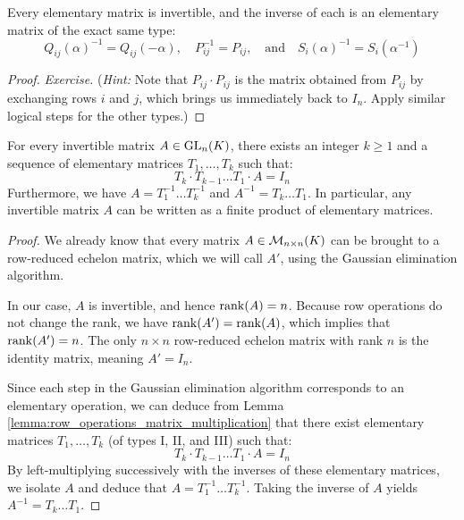 \begin{lemma}
\label{lemma:elementary_matrix_inverses}
Every elementary matrix is invertible, and the inverse of each is an elementary matrix of the exact same type:
\begin{equation*}
    Q_{ij}(\alpha)^{-1} = Q_{ij}(-\alpha), \quad P_{ij}^{-1} = P_{ij}, \quad \text{and} \quad S_i(\alpha)^{-1} = S_i(\alpha^{-1})
\end{equation*}
\end{lemma}

\begin{proof}
\textit{Exercise.} (\textit{Hint:} Note that $P_{ij} \cdot P_{ij}$ is the matrix obtained from $P_{ij}$ by exchanging rows $i$ and $j$, which brings us immediately back to $I_n$. Apply similar logical steps for the other types.)
\end{proof}

\begin{theorem}
\label{thm:elementary_matrix_decomposition}
For every invertible matrix $A \in \operatorname{GL}_n(K)$, there exists an integer $k \ge 1$ and a sequence of elementary matrices $T_1, \dots, T_k$ such that:
\begin{equation*}
    T_k \cdot T_{k-1} \dots T_1 \cdot A = I_n
\end{equation*}
Furthermore, we have $A = T_1^{-1} \dots T_k^{-1}$ and $A^{-1} = T_k \dots T_1$. In particular, any invertible matrix $A$ can be written as a finite product of elementary matrices.
\end{theorem}

\begin{proof}
We already know that every matrix $A \in \mathcal{M}_{n \times n}(K)$ can be brought to a row-reduced echelon matrix, which we will call $A'$, using the Gaussian elimination algorithm. 

In our case, $A$ is invertible, and hence $\operatorname{rank}(A) = n$. Because row operations do not change the rank, we have $\operatorname{rank}(A') = \operatorname{rank}(A)$, which implies that $\operatorname{rank}(A') = n$. The only $n \times n$ row-reduced echelon matrix with rank $n$ is the identity matrix, meaning $A' = I_n$. 

Since each step in the Gaussian elimination algorithm corresponds to an elementary operation, we can deduce from Lemma \ref{lemma:row_operations_matrix_multiplication} that there exist elementary matrices $T_1, \dots, T_k$ (of types I, II, and III) such that:
\begin{equation*}
    T_k \cdot T_{k-1} \dots T_1 \cdot A = I_n
\end{equation*}
By left-multiplying successively with the inverses of these elementary matrices, we isolate $A$ and deduce that $A = T_1^{-1} \dots T_k^{-1}$. Taking the inverse of $A$ yields $A^{-1} = T_k \dots T_1$.
\end{proof}

